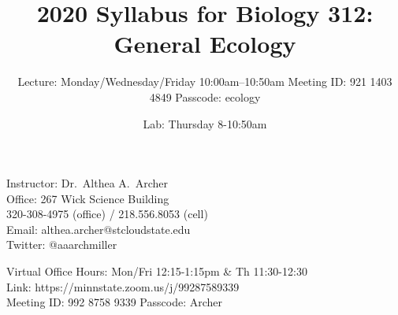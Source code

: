 \documentclass{tufte-handout}
\title{2020 Syllabus for Biology 312: General Ecology}										%
\author{Lecture: Monday/Wednesday/Friday 10:00am--10:50am Meeting ID: 921 1403 4849
Passcode: ecology}								%
\date{Lab: Thursday 8-10:50am}
\begin{document}
\maketitle

Instructor: Dr.~Althea A.~Archer\\
Office: 267 Wick Science Building\\
320-308-4975 (office) / 218.556.8053 (cell)\\
Email: althea.archer@stcloudstate.edu\\
Twitter: @aaarchmiller

Virtual Office Hours: Mon/Fri 12:15-1:15pm \& Th 11:30-12:30\\
Link: https://minnstate.zoom.us/j/99287589339\\
Meeting ID: 992 8758 9339 Passcode: Archer
\end{document}
